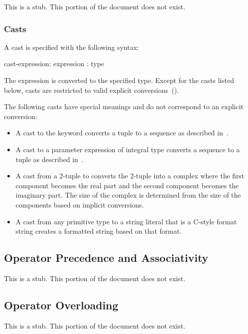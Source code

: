 This is a stub.  This portion of the document does not exist.

\subsubsection{Casts}
\label{Casts}

A cast is specified with the following syntax:
\begin{syntax}
cast-expression:
  expression : type
\end{syntax}
The expression is converted to the specified type.  Except for the
casts listed below, casts are restricted to valid explicit
conversions~().

The following casts have special meanings and do not correspond to an
explicit conversion:
\begin{itemize}
\item
  A cast to the keyword  converts a tuple to a sequence as
  described in~.
\item
  A cast to a parameter expression of integral type converts a
  sequence to a tuple as described
  in~.
\item
  A cast from a 2-tuple to  converts the 2-tuple into a
  complex where the first component becomes the real part and the
  second component becomes the imaginary part.  The size of the
  complex is determined from the size of the components based on
  implicit conversions.
\item
  A cast from any primitive type to a string literal that is a C-style
  format string creates a formatted string based on that format.
\end{itemize}

\subsection{Operator Precedence and Associativity}
\label{Operator_Precedence_and_Associativity}

This is a stub.  This portion of the document does not exist.

\subsection{Operator Overloading}
\label{Operator_Overloading}

This is a stub.  This portion of the document does not exist.


